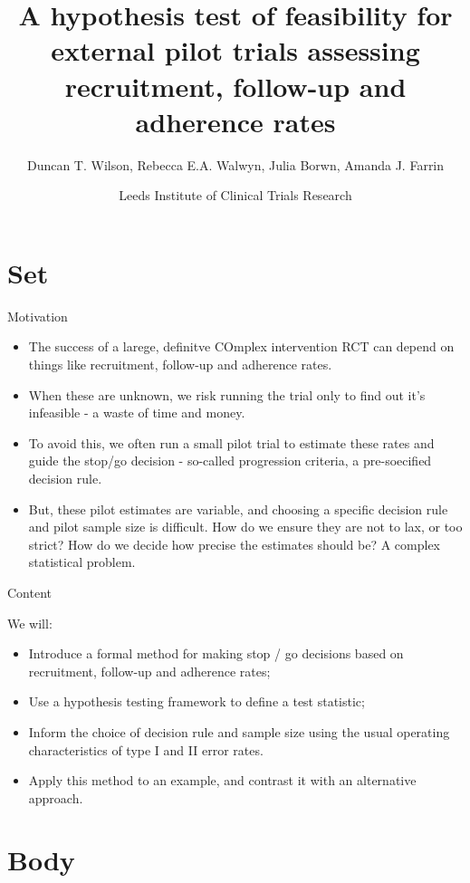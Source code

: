\documentclass[
  ignorenonframetext,
]{beamer}
\title{A hypothesis test of feasibility for external pilot trials assessing
recruitment, follow-up and adherence rates}
\author{Duncan T. Wilson, Rebecca E.A. Walwyn, Julia Borwn, Amanda J. Farrin}
\date{Leeds Institute of Clinical Trials Research}
\providecommand{\tightlist}{%
  \setlength{\itemsep}{0pt}\setlength{\parskip}{0pt}}
\begin{document}
\frame{\titlepage}

\hypertarget{set}{%
\section{Set}\label{set}}

\begin{frame}{Motivation}
\protect\hypertarget{motivation}{}

\begin{itemize}
\tightlist
\item
  The success of a larege, definitve COmplex intervention RCT can depend
  on things like recruitment, follow-up and adherence rates.
\item
  When these are unknown, we risk running the trial only to find out
  it's infeasible - a waste of time and money.
\item
  To avoid this, we often run a small pilot trial to estimate these
  rates and guide the stop/go decision - so-called progression criteria,
  a pre-soecified decision rule.
\item
  But, these pilot estimates are variable, and choosing a specific
  decision rule and pilot sample size is difficult. How do we ensure
  they are not to lax, or too strict? How do we decide how precise the
  estimates should be? A complex statistical problem.
\end{itemize}

\end{frame}

\begin{frame}{Content}
\protect\hypertarget{content}{}

We will:

\begin{itemize}
\tightlist
\item
  Introduce a formal method for making stop / go decisions based on
  recruitment, follow-up and adherence rates;
\item
  Use a hypothesis testing framework to define a test statistic;
\item
  Inform the choice of decision rule and sample size using the usual
  operating characteristics of type I and II error rates.
\item
  Apply this method to an example, and contrast it with an alternative
  approach.
\end{itemize}

\end{frame}

\hypertarget{body}{%
\section{Body}\label{body}}
\end{document}
